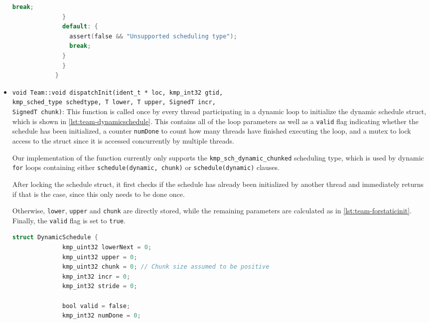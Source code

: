 \begin{itemize}
\begin{lstlisting}[language=C, caption={void Team::forStaticInit},
          label={lst:team-forstaticinit}, escapechar=@]
                break;
              }
              default: {
                assert(false && "Unsupported scheduling type");
                break;
              }
              }
            }
          \end{lstlisting}

	\item \texttt{void Team::void dispatchInit(ident_t * loc, kmp_int32 gtid,\\kmp_sched_type
		      schedtype, T lower, T upper, SignedT incr,\\SignedT chunk)}: \label{subsec:team-dispatch-init}
	      This function is called once by every thread participating in a dynamic loop to initialize the
	      dynamic schedule struct, which is shown in \cref{lst:team-dynamicschedule}. This  contains all
	      of the loop parameters as well as a \texttt{valid} flag indicating whether the schedule has
	      been initialized, a counter \texttt{numDone} to count how many threads have finished executing
	      the loop, and a mutex to lock access to the struct since it is accessed concurrently by
	      multiple threads.

	      Our implementation of the function currently only supports the
	      \texttt{kmp\_sch\_dynamic\_chunked} scheduling type, which is used by dynamic \texttt{for}
	      loops containing either \texttt{schedule(dynamic, chunk)} or \texttt{schedule(dynamic)}
	      clauses.

	      After locking the schedule struct, it first checks if the schedule has already been
	      initialized by another thread and immediately returns if that is the case, since this only
	      needs to be done once.

	      Otherwise, \texttt{lower}, \texttt{upper} and \texttt{chunk} are directly stored, while
	      the remaining parameters are calculated as in \cref{lst:team-forstaticinit}. Finally, the
	      \texttt{valid} flag is set to \texttt{true}.

	      \begin{lstlisting}[language=C, caption={struct Team::DynamicSchedule},
          label={lst:team-dynamicschedule}, escapechar=@]
            struct DynamicSchedule {
              kmp_uint32 lowerNext = 0;
              kmp_uint32 upper = 0;
              kmp_uint32 chunk = 0; // Chunk size assumed to be positive
              kmp_int32 incr = 0;
              kmp_int32 stride = 0;

              bool valid = false;
              kmp_int32 numDone = 0;


\end{lstlisting}
\end{itemize}
